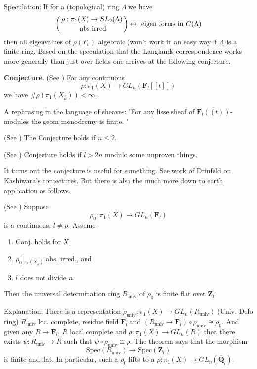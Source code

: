 \noindent
Speculation: If for a (topological) ring $\Lambda$ we have
$$
\left(
{\rho: \pi_1(X)\to SL_2(\Lambda)\atop \text{ abs irred}}
\right)
\leftrightarrow
\text{ eigen forms in } C(\Lambda)
$$
then all eigenvalues of $\rho(F_v)$ algebraic (won't work in an easy
way if $\Lambda$ is a finite ring. Based on the speculation that the
Langlands correspondence works more generally than just over fields
one arrives at the following conjecture.

\medskip\noindent
{\bf Conjecture.}
(See \cite{dJ-conjecture})
For any continuous
$$
\rho: \pi_1(X)\to GL_n(\mathbf{F}_l[[t]])
$$
we have $\# \rho(\pi_1(X_{\overline k}))<\infty$.

\medskip\noindent
A rephrasing in the language of sheaves:
"For any lisse sheaf of $\overline{\mathbf{F}_l((t))}$-modules the geom
monodromy is finite. "

\begin{theorem}
\label{theorem-conjecture-n-2}
(See \cite{dJ-conjecture}) The Conjecture holds if $n\leq 2$.
\end{theorem}

\begin{theorem}
\label{theorem-conjecture-l-bigger-2n}
(See \cite{Gaitsgory})
Conjecture holds if $l>2n$ modulo some unproven things.
\end{theorem}

\noindent
It turns out the conjecture is useful for something.
See work of Drinfeld on Kashiwara's conjectures. But there is also
the much more down to earth application as follows.

\begin{theorem}
\label{theorem-deformation-rings}
(See \cite[Theorem 3.5]{dJ-conjecture})
Suppose
$$
\rho_0: \pi_1(X)\to GL_n(\mathbf{F}_l)
$$
is a continuous, $l\neq p$. Assume
\begin{enumerate}
\item Conj. holds for $X$,
\item $\rho_0\left|_{\pi_1(X_{\overline k})}\right.$ abs. irred., and
\item $l$ does not divide $n$.
\end{enumerate}
Then the universal determination ring $R_{\text{univ}}$ of $\rho_0$ is
finite flat over $\mathbf{Z}_l$.
\end{theorem}

\noindent
Explanation: There is a representation $\rho_{\text{univ}}:
\pi_1(X)\to GL_n(R_{\text{univ}})$ (Univ. Defo ring) $R_{\text{univ}}$ loc.
complete, residue field $\mathbf{F}_l$ and $(R_{\text{univ}}\to
\mathbf{F}_l)\circ\rho_{\text{univ}}\cong\rho_0$.
And given any $R\to \mathbf{F}_l$, $R$ local complete and $\rho: \pi_1(X)\to
GL_n(R)$ then there exists $\psi: R_{\text{univ}}\to R$ such that
$\psi\circ\rho_{\text{univ}}\cong \rho$. The theorem says that the morphism
$$
\text{Spec}(R_{\text{univ}})
\longrightarrow
\text{Spec}(\mathbf{Z}_l)
$$
is finite and flat. In particular, such a $\rho_0$
lifts to a $\rho: \pi_1(X)\to GL_n(\overline{\mathbf{Q}}_l)$.

